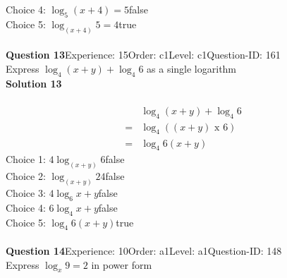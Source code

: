 \documentclass{article}
\begin{document}
Choice 4: \hspace{20pt}$\log_{5}(x+4)=5$\hspace{20pt}false\\
Choice 5: \hspace{20pt}$\log_{(x+4)}5=4$\hspace{20pt}true\\
\\[4pt]
\noindent\textbf{Question 13}\hspace{20pt}Experience: 15\hspace{20pt}Order: c1\hspace{20pt}Level: c1\hspace{20pt}Question-ID: 161\\[2pt]
Express $\log_{4}(x+y)+\log_{4}6$ as a single logarithm\\[4pt]
\noindent\textbf{Solution 13}\\[2pt]
\\[-35pt]\begin{align*}
&\log_{4}(x+y)+\log_{4}6\\[2pt]
=&\log_{4}((x+y) \,\, \text{x} \,\, 6)\\[2pt]
=&\log_{4}6(x+y)
\end{align*}
Choice 1: \hspace{20pt}$4\log_{(x+y)}6$\hspace{20pt}false\\
Choice 2: \hspace{20pt}$\log_{(x+y)}24$\hspace{20pt}false\\
Choice 3: \hspace{20pt}$4\log_{6}x+y$\hspace{20pt}false\\
Choice 4: \hspace{20pt}$6\log_{4}x+y$\hspace{20pt}false\\
Choice 5: \hspace{20pt}$\log_{4}6(x+y)$\hspace{20pt}true\\
\\[4pt]
\noindent\textbf{Question 14}\hspace{20pt}Experience: 10\hspace{20pt}Order: a1\hspace{20pt}Level: a1\hspace{20pt}Question-ID: 148\\[2pt]
Express $\log_x9=2$ in power form\\[4pt]
\end{document}
